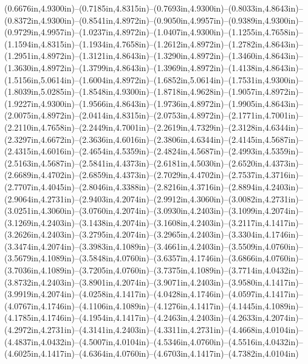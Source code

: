 (0.6676in,4.9300in)--(0.7185in,4.8315in)--(0.7693in,4.9300in)--(0.8033in,4.8643in)--(0.8372in,4.9300in)--(0.8541in,4.8972in)--(0.9050in,4.9957in)--(0.9389in,4.9300in)--(0.9729in,4.9957in)--(1.0237in,4.8972in)--(1.0407in,4.9300in)--(1.1255in,4.7658in)--(1.1594in,4.8315in)--(1.1934in,4.7658in)--(1.2612in,4.8972in)--(1.2782in,4.8643in)--(1.2951in,4.8972in)--(1.3121in,4.8643in)--(1.3290in,4.8972in)--(1.3460in,4.8643in)--(1.3630in,4.8972in)--(1.3799in,4.8643in)--(1.3969in,4.8972in)--(1.4138in,4.8643in)--(1.5156in,5.0614in)--(1.6004in,4.8972in)--(1.6852in,5.0614in)--(1.7531in,4.9300in)--(1.8039in,5.0285in)--(1.8548in,4.9300in)--(1.8718in,4.9628in)--(1.9057in,4.8972in)--(1.9227in,4.9300in)--(1.9566in,4.8643in)--(1.9736in,4.8972in)--(1.9905in,4.8643in)--(2.0075in,4.8972in)--(2.0414in,4.8315in)--(2.0753in,4.8972in)--(2.1771in,4.7001in)--(2.2110in,4.7658in)--(2.2449in,4.7001in)--(2.2619in,4.7329in)--(2.3128in,4.6344in)--(2.3297in,4.6672in)--(2.3636in,4.6016in)--(2.3806in,4.6344in)--(2.4145in,4.5687in)--(2.4315in,4.6016in)--(2.4654in,4.5359in)--(2.4824in,4.5687in)--(2.4993in,4.5359in)--(2.5163in,4.5687in)--(2.5841in,4.4373in)--(2.6181in,4.5030in)--(2.6520in,4.4373in)--(2.6689in,4.4702in)--(2.6859in,4.4373in)--(2.7029in,4.4702in)--(2.7537in,4.3716in)--(2.7707in,4.4045in)--(2.8046in,4.3388in)--(2.8216in,4.3716in)--(2.8894in,4.2403in)--(2.9064in,4.2731in)--(2.9403in,4.2074in)--(2.9912in,4.3060in)--(3.0082in,4.2731in)--(3.0251in,4.3060in)--(3.0760in,4.2074in)--(3.0930in,4.2403in)--(3.1099in,4.2074in)--(3.1269in,4.2403in)--(3.1438in,4.2074in)--(3.1608in,4.2403in)--(3.2117in,4.1417in)--(3.2626in,4.2403in)--(3.2795in,4.2074in)--(3.2965in,4.2403in)--(3.3304in,4.1746in)--(3.3474in,4.2074in)--(3.3983in,4.1089in)--(3.4661in,4.2403in)--(3.5509in,4.0760in)--(3.5679in,4.1089in)--(3.5848in,4.0760in)--(3.6357in,4.1746in)--(3.6866in,4.0760in)--(3.7036in,4.1089in)--(3.7205in,4.0760in)--(3.7375in,4.1089in)--(3.7714in,4.0432in)--(3.8732in,4.2403in)--(3.8901in,4.2074in)--(3.9071in,4.2403in)--(3.9580in,4.1417in)--(3.9919in,4.2074in)--(4.0258in,4.1417in)--(4.0428in,4.1746in)--(4.0597in,4.1417in)--(4.0767in,4.1746in)--(4.1106in,4.1089in)--(4.1276in,4.1417in)--(4.1445in,4.1089in)--(4.1785in,4.1746in)--(4.1954in,4.1417in)--(4.2463in,4.2403in)--(4.2633in,4.2074in)--(4.2972in,4.2731in)--(4.3141in,4.2403in)--(4.3311in,4.2731in)--(4.4668in,4.0104in)--(4.4837in,4.0432in)--(4.5007in,4.0104in)--(4.5346in,4.0760in)--(4.5516in,4.0432in)--(4.6025in,4.1417in)--(4.6364in,4.0760in)--(4.6703in,4.1417in)--(4.7382in,4.0104in) 